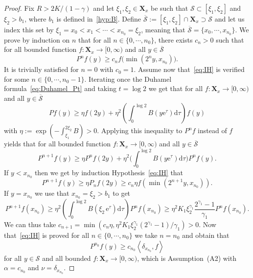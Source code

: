 \documentclass[AHL,Unicode,longabstracts,published]{cedram}
\renewcommand{\geq}{\geqslant}
\newcommand{\Scal}{\mathcal{S}}
\newcommand{\1}{\mathds{1}}
\newcommand{\X}{\mathbf{X}}
\newcommand{\e}{\mathrm{e}}
\renewcommand{\d}{\mathrm{d}}
\begin{document}
\begin{proof}
Fix $R>2K/(1-\gamma)$ and let $\xi_1,\xi_2\in\X_x$ be such that $\Scal \subset[\xi_1,\xi_2]$ and $\xi_2> b_1$, where $b_1$ is defined in~\eqref{hyp:B}. Define $\overline{\Scal}:=[\xi_1,\xi_2]\cap\X_x\supset\Scal$ and let us index this set by $\xi_1=x_0<x_1<\cdots<x_{n_0}=\xi_2$, meaning that $\overline{\Scal}=\{x_0,\cdots,x_{n_0}\}$. We prove by induction on $n$ that for all $n\in\{0,\cdots,n_0\}$, there exists $c_n>0$ such that for all bounded function $f:\X_x\to[0,\infty)$ and all $y\in\overline{\Scal}$
\begin{equation}\label{eq:IH}
P^nf(y)\geq c_n f\big(\min\left(2^ny,x_{n_0}\right)\big).
\end{equation}
It is trivially satisfied for $n=0$ with $c_0=1$. Assume now that~\eqref{eq:IH} is verified for some $n\in\{0,\cdots,n_0-1\}$. Iterating once the Duhamel formula~\eqref{eq:Duhamel_Pt} and taking $t=\log2$ we get that for all $f:\X_x\to[0,\infty)$ and all $y\in\overline{\Scal}$
\[
Pf(y)\geq \eta f(2y) + \eta^2\left(\int_0^{\log2} B\left(y\e^\tau\right)\d\tau\right)f(y)
\]
with $\eta:=\exp(-\int_{\xi_1}^{2\xi_2}B)>0$. Applying this inequality to $P^nf$ instead of $f$ yields that for all bounded function $f:\X_x\to[0,\infty)$ and all $y\in\overline{\Scal}$
\[
P^{n+1}f(y)\geq \eta P^nf(2y) + \eta^2\bigg(\int_0^{\log2} B(y\e^\tau)\d\tau\bigg)P^nf(y).
\]
If $y<x_{n_0}$ then we get by induction Hypothesis~\eqref{eq:IH} that
\[
P^{n+1}f(y)\geq \eta P_nf(2y)\geq c_n\eta f\left(\min\left(2^{n+1}y,x_{n_0}\right)\right).
\]
If $y=x_{n_0}$ we use that $x_{n_0}=\xi_2>b_1$ to get
\[
P^{n+1}f\left(x_{n_0}\right)\geq\eta^2\left(\!\int_0^{\log2} B\left(\xi_2\,\e^\tau\right)\d\tau\!\right)P^nf\left(x_{n_0}\right)
\geq\eta^2K_1\xi_2^{\gamma_1}\frac{2^{\gamma_1}-1}{\gamma_1}P^nf\left(x_{n_0}\right).
\]
We can thus take $c_{n+1}=\min(c_n\eta,\eta^2K_1\xi_2^{\gamma_1}(2^{\gamma_1}-1)/\gamma_1)>0$. Now that~\eqref{eq:IH} is proved for all $n\in\{0,\cdots,n_0\}$ we take $n=n_0$ and obtain that
\[
P^{n_0}f(y)\geq c_{n_0}\left\langle\delta_{x_{n_0}},f\right\rangle
\]
for all $y\in\Scal$ and all bounded $f:\X_x\to[0,\infty)$, which is Assumption~(A2) with $\alpha=c_{n_0}$ and $\nu=\delta_{x_{n_0}}$.



\end{proof}
\end{document}
